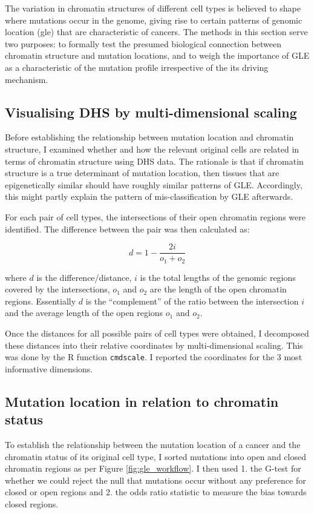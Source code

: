 The variation in chromatin structures of different cell types is believed to shape where mutations occur in the genome, giving rise to certain patterns of genomic location (\gls{gle}) that are characteristic of cancers. The methods in this section serve two purposes: to formally test the presumed biological connection between chromatin structure and mutation locations, and to weigh the importance of GLE as a characteristic of the mutation profile irrespective of the its driving mechanism.  

\subsection{Visualising DHS by multi-dimensional scaling}\label{methods:encode_pca}
Before establishing the relationship between mutation location and chromatin structure, I examined whether and how the relevant original cells are related in terms of chromatin structure using DHS data. The rationale is that if chromatin structure is a true determinant of mutation location, then tissues that are epigenetically similar should have roughly similar patterns of GLE. Accordingly, this might partly explain the pattern of mis-classification by GLE afterwards.

For each pair of cell types, the intersections of their open chromatin regions were identified. The difference between the pair was then calculated as:

\begin{equation}
    d = 1 - \frac{2i}{o_1 + o_2}
\end{equation}

where $d$ is the difference/distance, $i$ is the total lengths of the genomic regions covered by the intersections, $o_1$ and $o_2$ are the length of the open chromatin regions. Essentially $d$ is the ``complement'' of the ratio between the intersection $i$ and the average length of the open regions $o_1$ and $o_2$. 

Once the distances for all possible pairs of cell types were obtained, I decomposed these distances into their relative coordinates by multi-dimensional scaling. This was done by the R function \texttt{cmdscale}. I reported the coordinates for the 3 most informative dimensions. %

\subsection{Mutation location in relation to chromatin status}
To establish the relationship between the mutation location of a cancer and the chromatin status of its original cell type, I sorted mutations into open and closed chromatin regions as per Figure \ref{fig:gle_workflow}. I then used 1. the G-test for whether we could reject the null that mutations occur without any preference for closed or open regions and 2. the odds ratio statistic to measure the bias towards closed regions.

